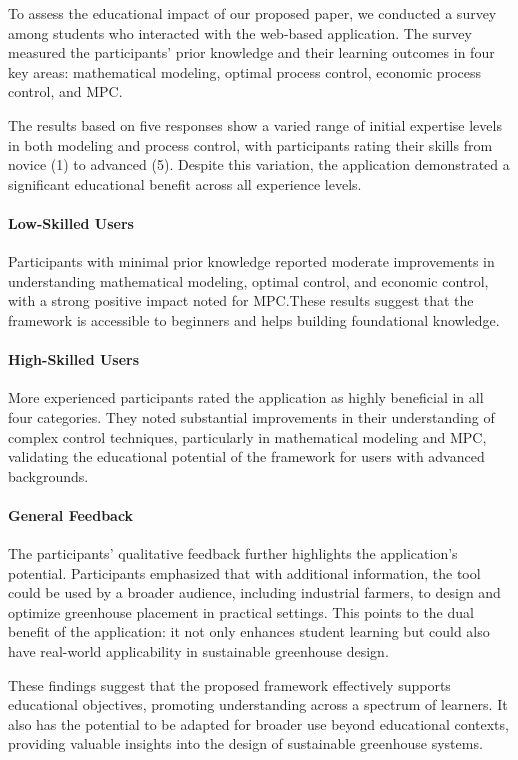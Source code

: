 \documentclass[conference]{IEEEtran}
\begin{document}
To assess the educational impact of our proposed paper, we conducted a survey among students who interacted with the web-based application. The survey measured the participants' prior knowledge and their learning outcomes in four key areas: mathematical modeling, optimal process control, economic process control, and MPC.\@

The results based on five responses show a varied range of initial expertise levels in both modeling and process control, with participants rating their skills from novice (1) to advanced (5). Despite this variation, the application demonstrated a significant educational benefit across all experience levels.

\paragraph{Low-Skilled Users}
Participants with minimal prior knowledge reported moderate improvements in understanding mathematical modeling, optimal control, and economic control, with a strong positive impact noted for MPC.\@ These results suggest that the framework is accessible to beginners and helps building foundational knowledge.

\paragraph{High-Skilled Users}
More experienced participants rated the application as highly beneficial in all four categories. They noted substantial improvements in their understanding of complex control techniques, particularly in mathematical modeling and MPC, validating the educational potential of the framework for users with advanced backgrounds.

\paragraph{General Feedback}
The participants' qualitative feedback further highlights the application's potential. Participants emphasized that with additional information, the tool could be used by a broader audience, including industrial farmers, to design and optimize greenhouse placement in practical settings. This points to the dual benefit of the application: it not only enhances student learning but could also have real-world applicability in sustainable greenhouse design.

These findings suggest that the proposed framework effectively supports educational objectives, promoting understanding across a spectrum of learners. It also has the potential to be adapted for broader use beyond educational contexts, providing valuable insights into the design of sustainable greenhouse systems.
\end{document}
